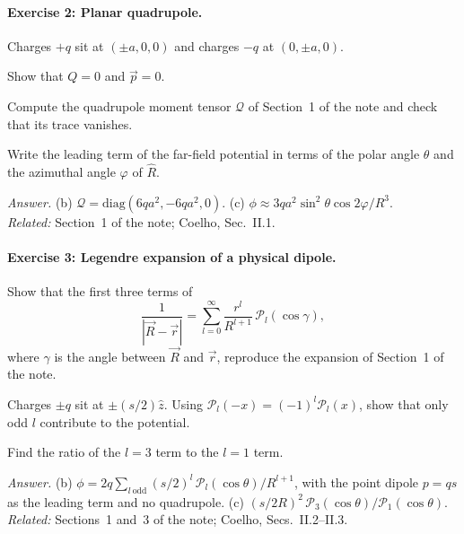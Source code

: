 \documentclass[11pt]{article}      %
\numberwithin{equation}{section}   %
\begin{document}
\paragraph{Exercise 2: Planar quadrupole.}
Charges $+q$ sit at $(\pm a, 0, 0)$ and charges $-q$ at $(0, \pm a, 0)$.
\begin{parts}
    \item Show that $Q = 0$ and $\vec p = 0$.
    \item Compute the quadrupole moment tensor $\mathcal{Q}$ of Section~1 of the note and check that its trace vanishes.
    \item Write the leading term of the far-field potential in terms of the polar angle $\theta$ and the azimuthal angle $\varphi$ of $\hat R$.
\end{parts}
\textit{Answer.} (b) $\mathcal{Q} = \mathrm{diag}(6qa^2, -6qa^2, 0)$. (c) $\phi \approx 3qa^2\sin^2\theta\cos 2\varphi/R^3$.\\
\textit{Related:} Section~1 of the note; Coelho, Sec.~II.1.

\paragraph{Exercise 3: Legendre expansion of a physical dipole.}
\begin{parts}
    \item Show that the first three terms of
    \begin{equation*}
        \frac{1}{|\vec R - \vec r|} = \sum_{l=0}^{\infty}\frac{r^l}{R^{l+1}}\,\mathcal{P}_l(\cos\gamma),
    \end{equation*}
    where $\gamma$ is the angle between $\vec R$ and $\vec r$, reproduce the expansion of Section~1 of the note.
    \item Charges $\pm q$ sit at $\pm(s/2)\hat z$. Using $\mathcal{P}_l(-x) = (-1)^l\mathcal{P}_l(x)$, show that only odd $l$ contribute to the potential.
    \item Find the ratio of the $l = 3$ term to the $l = 1$ term.
\end{parts}
\textit{Answer.} (b) $\phi = 2q\sum_{l\ \text{odd}} (s/2)^l\,\mathcal{P}_l(\cos\theta)/R^{l+1}$, with the point dipole $p = qs$ as the leading term and no quadrupole. (c) $(s/2R)^2\,\mathcal{P}_3(\cos\theta)/\mathcal{P}_1(\cos\theta)$.\\
\textit{Related:} Sections~1 and~3 of the note; Coelho, Secs.~II.2--II.3.
\end{document}

